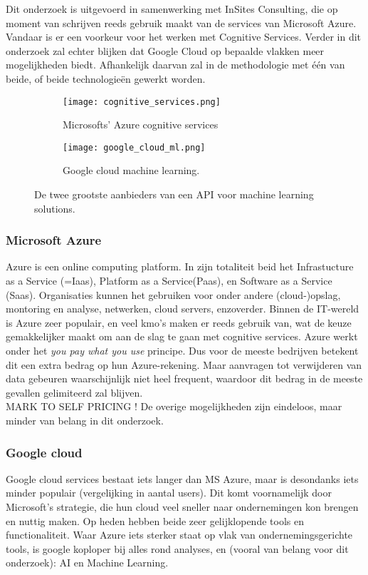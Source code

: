 Dit onderzoek is uitgevoerd in samenwerking met InSites Consulting, die op moment van schrijven reeds gebruik maakt van de services van Microsoft Azure. Vandaar is er een voorkeur voor het werken met Cognitive Services. Verder in dit onderzoek zal echter blijken dat Google Cloud op bepaalde vlakken meer mogelijkheden biedt. Afhankelijk daarvan zal in de methodologie met één van beide, of beide technologieën gewerkt worden. 

\begin{figure}[h]
    \centering
    \begin{subfigure}{0.5\textwidth}
        \centering
        \texttt{[image: cognitive\_services.png]}
        \caption{Microsofts' Azure cognitive services}
        \label{fig:sub11}
    \end{subfigure}%
    \begin{subfigure}{0.5\textwidth}
        \centering
        \texttt{[image: google\_cloud\_ml.png]}
        \caption{Google cloud machine learning.}
        \label{fig:sub22}
    \end{subfigure}
    \caption{De twee grootste aanbieders van een API voor machine learning solutions.}
    \label{fig:test2}
\end{figure}

\subsubsection{Microsoft Azure}
Azure is een online computing platform. In zijn totaliteit beid het Infrastucture as a Service (=Iaas), Platform as a Service(Paas), en Software as a Service (Saas). Organisaties kunnen het gebruiken voor onder andere (cloud-)opslag, montoring en analyse, netwerken, cloud servers, enzoverder. 
Binnen de IT-wereld is Azure zeer populair, en veel kmo's maken er reeds gebruik van, wat de keuze gemakkelijker maakt om aan de slag te gaan met cognitive services. Azure werkt onder het \textit{you pay what you use} principe. Dus voor de meeste bedrijven betekent dit een extra bedrag op hun Azure-rekening. Maar aanvragen tot verwijderen van data gebeuren waarschijnlijk niet heel frequent, waardoor dit bedrag in de meeste gevallen gelimiteerd zal blijven. \\MARK TO SELF PRICING !
De overige mogelijkheden zijn eindeloos, maar minder van belang in dit onderzoek. 

\subsubsection{Google cloud}
Google cloud services bestaat iets langer dan MS Azure, maar is desondanks iets minder populair (vergelijking in aantal users). Dit komt voornamelijk door Microsoft's strategie, die hun cloud veel sneller naar ondernemingen kon brengen en nuttig maken. Op heden hebben beide zeer gelijklopende tools en functionaliteit. Waar Azure iets sterker staat op vlak van ondernemingsgerichte tools, is google koploper bij alles rond analyses, en (vooral van belang voor dit onderzoek): AI en Machine Learning. 

